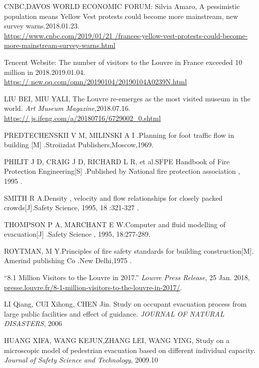 \documentclass[12pt]{article}
\begin{document}
\begin{thebibliography}{99}


CNBC,DAVOS WORLD ECONOMIC FORUM: Silvia Amaro, A pessimistic population means Yellow Vest protests 
could become more mainstream, new survey warns.2018.01.23.\\ \url{https://www.cnbc.com/2019/01/21
/frances-yellow-vest-protests-could-become-more-mainstream-survey-warns.html}


Tencent Website: The number of visitors to the Louvre in France exceeded 10 million in 2018.2019.01.04.\\ \url{https://
new.qq.com/omn/20190104/20190104A0239N.html}

LIU BEI, MIU YALI, The Louvre re-emerges as the most visited museum in the world. \emph{Art Museum Magazine},2018.07.16.\\ \url{https://
js.ifeng.com/a/20180716/6729002_0.shtml}




PREDTECHENSKII V M, MILINSKI A I .Planning for foot traffic flow in building 
               [M] .Stroiizdat Publishers,Moscow,1969.

PHILIT J D, CRAIG J D, RICHARD L R, et al.SFPE Handbook of Fire Protection Engineering[S] .Published by National fire protection association , 1995 .

SMITH R A.Density , velocity and flow relationships for closely packed
               crowds[J].Safety Science, 1995, 18 :321-327 .

THOMPSON P A, MARCHANT E W.Computer and fluid modelling of evacuation[J] .Safety Science , 1995, 18:277-289.

ROYTMAN, M Y.Principles of fire safety standards for building construction[M]. Amerind publishing Co .New Delhi,1975 .

“8.1 Million Visitors to the Louvre in 2017.” \emph{Louvre Press Release}, 25 Jan. 2018,\\\url{presse.louvre.fr/8-1-million-visitors-to-the-louvre-in-2017/}.

LI Qiang, CUI Xihong, CHEN Jin. Study on occupant evacuation process from large public facilities and effect of guidance. \emph{JOURNAL OF NATURAL DISASTERS}, 2006

HUANG XIFA, WANG KEJUN,ZHANG LEI, WANG YING, Study on a microscopic model of pedestrian evacuation based on different individual capacity. 
\emph{Journal of Safety Science and Technology}, 2009.10


\end{thebibliography}
\end{document}
